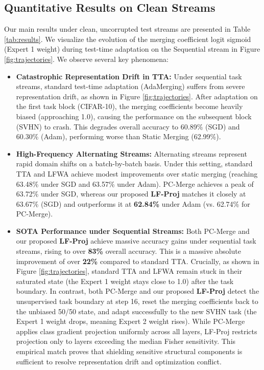 \documentclass{article}
\theoremstyle{plain}
\theoremstyle{definition}
\theoremstyle{remark}
\begin{document}
\subsection{Quantitative Results on Clean Streams}
Our main results under clean, uncorrupted test streams are presented in Table \ref{tab:results}.
We visualize the evolution of the merging coefficient logit sigmoid (Expert 1 weight) during test-time adaptation on the Sequential stream in Figure \ref{fig:trajectories}.
We observe several key phenomena:
\begin{itemize}
    \item \textbf{Catastrophic Representation Drift in TTA:} Under sequential task streams, standard test-time adaptation (AdaMerging) suffers from severe representation drift, as shown in Figure \ref{fig:trajectories}. After adaptation on the first task block (CIFAR-10), the merging coefficients become heavily biased (approaching 1.0), causing the performance on the subsequent block (SVHN) to crash. This degrades overall accuracy to 60.89\% (SGD) and 60.30\% (Adam), performing worse than Static Merging (62.99\%).
    \item \textbf{High-Frequency Alternating Streams:} Alternating streams represent rapid domain shifts on a batch-by-batch basis. Under this setting, standard TTA and LFWA achieve modest improvements over static merging (reaching 63.48\% under SGD and 63.57\% under Adam). PC-Merge achieves a peak of 63.72\% under SGD, whereas our proposed \textbf{LF-Proj} matches it closely at 63.67\% (SGD) and outperforms it at \textbf{62.84\%} under Adam (vs. 62.74\% for PC-Merge).
    \item \textbf{SOTA Performance under Sequential Streams:} Both PC-Merge and our proposed \textbf{LF-Proj} achieve massive accuracy gains under sequential task streams, rising to over \textbf{83\%} overall accuracy. This is a massive absolute improvement of over \textbf{22\%} compared to standard TTA. Crucially, as shown in Figure \ref{fig:trajectories}, standard TTA and LFWA remain stuck in their saturated state (the Expert 1 weight stays close to 1.0) after the task boundary. In contrast, both PC-Merge and our proposed \textbf{LF-Proj} detect the unsupervised task boundary at step 16, reset the merging coefficients back to the unbiased 50/50 state, and adapt successfully to the new SVHN task (the Expert 1 weight drops, meaning Expert 2 weight rises). While PC-Merge applies class gradient projection uniformly across all layers, LF-Proj restricts projection only to layers exceeding the median Fisher sensitivity. This empirical match proves that shielding sensitive structural components is sufficient to resolve representation drift and optimization conflict.
\end{itemize}
\end{document}
